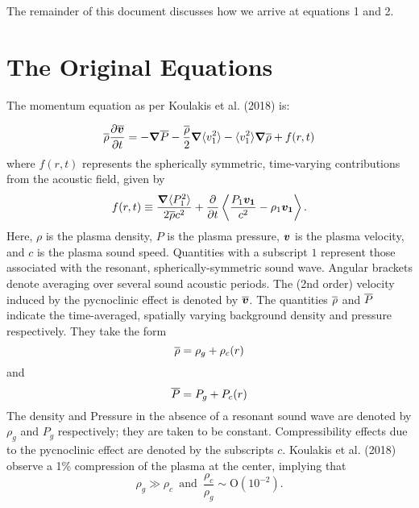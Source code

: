The remainder of this document discusses how we arrive at equations 1 and 2.

\section{The Original Equations}
The momentum equation as per Koulakis et al. (2018) is:

\begin{equation}
\label{eq:momentum}
\rhobar\frac{ \partial \vvecbar }{\partial t}  =    -\boldsymbol{\nabla}\Pbar  %
						        - \frac{\rhobar}{2}\boldsymbol{\nabla}\langle v_1^2\rangle
							- \langle v_1^2\rangle\boldsymbol{\nabla}\rhobar
							+ f(r,t)
\end{equation}
where $f(r,t)$ represents the spherically symmetric, time-varying contributions from the acoustic field, given by
\begin{equation}
\label{eq:dtterms}
f(r,t) \equiv \frac{\boldsymbol{\nabla}\langle P_1^2 \rangle}{2\overline{\rho} c^2}+\frac{\partial}{\partial t}\left\langle \frac{P_1\boldsymbol{v_1}}{c^2} -\rho_1 \boldsymbol{v_1} \right\rangle.
\end{equation}
Here, $\rho$ is the plasma density, $P$ is the plasma pressure, $\boldsymbol{v}$ is the plasma velocity, and $c$ is the plasma sound speed.  Quantities with a subscript $1$ represent those associated with the resonant, spherically-symmetric sound wave.  Angular brackets denote averaging over several sound acoustic periods.  The (2nd order) velocity induced by the pycnoclinic effect is denoted by $\overline{\boldsymbol{v}}$.  The quantities $\overline{\rho}$ and $\overline{P}$ indicate the time-averaged, spatially varying background density and pressure respectively.   They take the form
\begin{equation}
\overline{\rho} = \rho_g+\rho_c(r)
\end{equation}
and
\begin{equation}
\overline{P} = P_g+P_c(r)
\end{equation}
The density and Pressure in the absence of a resonant sound wave are denoted by $\rho_g$ and $P_g$ respectively; they are taken to be constant.   Compressibility effects due to the pycnoclinic effect are denoted by the subscripts $c$.   Koulakis et al. (2018) observe a 1\% compression of the plasma at the center, implying that
\begin{equation}
\label{eq:compress}
\rho_g \gg \rho_c \,\,\,\mathrm{and}\,\,\,
\frac{\rho_c}{\rho_g}\sim \mathrm{O}(10^{-2}).
\end{equation}

